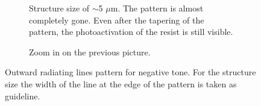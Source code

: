 \begin{figure}[!t]
\begin{subfigure}[t]{0.24\linewidth}
  	\label{fig:b2d23_q23}
  \end{subfigure}
 \hfill
     \begin{subfigure}[t]{0.24\linewidth}
  	\centering
  	\caption{Structure size of $\sim$5 $\mu$m. The pattern is almost completely gone. Even after the tapering of the pattern, the photoactivation of the resist is still visible.}
  	\label{fig:b2d24_q24}
  \end{subfigure}
\hfill
     \begin{subfigure}[t]{0.24\linewidth}
  	\caption{Zoom in on the previous picture.}
  	\label{fig:b2d25_q25}
  \end{subfigure}
 \hfill
\caption{Outward radiating lines pattern for negative tone. For the structure size the width of the line at the edge of the pattern is taken as guideline.}
 \end{figure}

